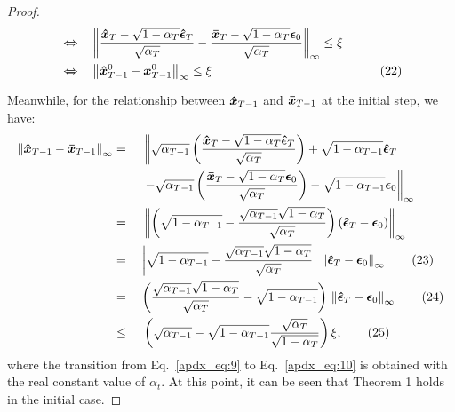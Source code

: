 \documentclass{article}
\newtheorem{proof}{Proof}
\begin{document}
\begin{proof}
\begin{alignat}{3}
& \xLeftrightarrow{} &&\left\|\frac{\boldsymbol{\Hat{x}}_{T} - \sqrt{1-\alpha_{T}}\boldsymbol{\Hat{\epsilon}}_{T}}{\sqrt{\alpha_{T}}} - \frac{\boldsymbol{\Bar{x}}_{T} - \sqrt{1-\alpha_{T}}\boldsymbol{\epsilon}_0}{\sqrt{\alpha_{T}}}\right\|_\infty \leq \xi & \notag  \\ 
& \xLeftrightarrow{} && \left\|\boldsymbol{\Hat{x}}_{T-1}^{0} -  \boldsymbol{\Bar{x}}_{T-1}^{0}\right\|_\infty \leq \xi & \tag{22} \label{apdx_eq:8}
\end{alignat}
Meanwhile, for the relationship between $\boldsymbol{\Hat{x}}_{T-1}$ and $\boldsymbol{\Bar{x}}_{T-1}$ at the initial step, we have:
\begin{alignat}{2}
\left\|\boldsymbol{\Hat{x}}_{T-1} - \boldsymbol{\Bar{x}}_{T-1}\right\|_\infty \notag 
&= \; && \left\|\sqrt{\alpha_{T-1}}\left(\frac{\boldsymbol{\Hat{x}}_T-\sqrt{1-\alpha_T}\boldsymbol{\Hat{\epsilon}}_T}{\sqrt{\alpha_T}}\right) + \sqrt{1-\alpha_{T-1}}\boldsymbol{\Hat{\epsilon}}_T \right. \notag \\
& && \left. - \sqrt{\alpha_{T-1}}\left(\frac{\boldsymbol{\Bar{x}}_T-\sqrt{1-\alpha_T}\boldsymbol{{\epsilon}}_0}{\sqrt{\alpha_T}}\right) - \sqrt{1-\alpha_{T-1}}\boldsymbol{{\epsilon}}_0 \right\|_\infty \notag \\
&= \; && \left\| \left(\sqrt{1-\alpha_{T-1}} - \frac{\sqrt{\alpha_{T-1}}\sqrt{1-\alpha_T}}{\sqrt{\alpha_T}}\right) \left(\boldsymbol{\Hat{\epsilon}}_T - \boldsymbol{{\epsilon}}_0\right) \right\|_\infty \notag \\
&= \; && {\left|\sqrt{1-\alpha_{T-1}} - \frac{\sqrt{\alpha_{T-1}}\sqrt{1-\alpha_T}}{\sqrt{\alpha_T}}\right|}\,\left\|\boldsymbol{\Hat{\epsilon}}_T - \boldsymbol{{\epsilon}}_0\right\|_\infty \tag{23} \label{apdx_eq:9}  \\
&= \; && {\left(\frac{\sqrt{\alpha_{T-1}}\sqrt{1-\alpha_T}}{\sqrt{\alpha_T}} - \sqrt{1-\alpha_{T-1}}\right)} \,\left\|\boldsymbol{\Hat{\epsilon}}_T - \boldsymbol{{\epsilon}}_0\right\|_\infty \tag{24} \label{apdx_eq:10} \\
&\leq \; && \left(\sqrt{\alpha_{T-1}} - \sqrt{1-\alpha_{T-1}}\frac{\sqrt{\alpha_{T}}}{\sqrt{1-\alpha_{T}}}\right)\xi, \tag{25} \label{apdx_eq:11}
\end{alignat}
where the transition from Eq.~\eqref{apdx_eq:9} to Eq.~\eqref{apdx_eq:10} is obtained with the real constant value of $\alpha_t$. At this point, it can be seen that Theorem 1 holds in the initial case.


\end{proof}
\end{document}
